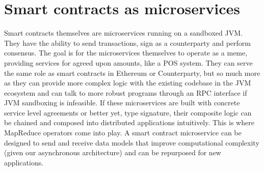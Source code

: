 \documentclass{article}
\begin{document}
\section{Smart contracts as microservices}
Smart contracts themselves are microservices running on a sandboxed JVM. They have the ability to send transactions, sign as a counterparty and perform consensus. The goal is for the microservices themselves to operate as a meme, providing services for agreed upon amounts, like a POS system. They can serve the same role as smart contracts in Ethereum or Counterparty, but so much more as they can provide more complex logic with the existing codebase in the JVM ecosystem and can talk to more robust programs through an RPC interface if JVM sandboxing is infeasible. If these microservices are built with concrete service level agreements or better yet, type signature, their composite logic can be chained and composed into distributed applications intuitively. This is where MapReduce operators come into play. A smart contract microservice can be designed to send and receive data models that improve computational complexity (given our asynchronous architecture) and can be repurposed for new applications.


\end{document}
